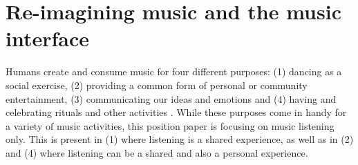 \documentclass[sigchi]{acmart}
\begin{document}

\section{Re-imagining music and the music interface}

Humans create and consume music for four different purposes: (1) dancing as a social exercise, (2) providing a common form of personal or community entertainment, (3) communicating our ideas and emotions and (4) having and celebrating rituals and other activities \cite{montagu2017music}. While these purposes come in handy for a variety of music activities, this position paper is focusing on music listening only. This is present in (1) where listening is a shared experience, as well as in (2) and (4) where listening can be a  shared and also a personal experience. 
\end{document}
